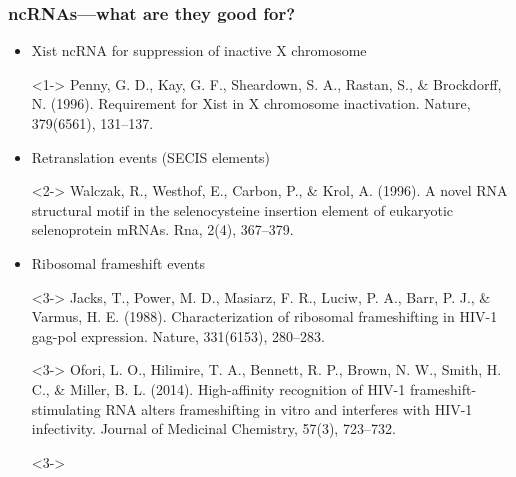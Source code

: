 \documentclass{beamer}
\begin{document}
\begin{frame}
  \frametitle{ncRNAs---what are they good for?}

  \begin{itemize}
  \item<1-> Xist ncRNA for suppression of inactive X chromosome
  \item[]<1-> \scriptsize Penny, G. D., Kay, G. F., Sheardown, S. A., Rastan, S., \& Brockdorff, N. (1996). Requirement for Xist in X chromosome inactivation. Nature, 379(6561), 131--137.
  \item<2-> Retranslation events (SECIS elements)
  \item[]<2-> \scriptsize Walczak, R., Westhof, E., Carbon, P., \& Krol, A. (1996). A novel RNA structural motif in the selenocysteine insertion element of eukaryotic selenoprotein mRNAs. Rna, 2(4), 367--379.
  \item<3-> Ribosomal frameshift events
  \item[]<3-> \scriptsize Jacks, T., Power, M. D., Masiarz, F. R., Luciw, P. A., Barr, P. J., \& Varmus, H. E. (1988). Characterization of ribosomal frameshifting in HIV-1 gag-pol expression. Nature, 331(6153), 280--283.
  \item[]<3-> \scriptsize Ofori, L. O., Hilimire, T. A., Bennett, R. P., Brown, N. W., Smith, H. C., \& Miller, B. L. (2014). High-affinity recognition of HIV-1 frameshift-stimulating RNA alters frameshifting in vitro and interferes with HIV-1 infectivity. Journal of Medicinal Chemistry, 57(3), 723--732.
  \item[]<3->
  \end{itemize}
\end{frame}
\end{document}
